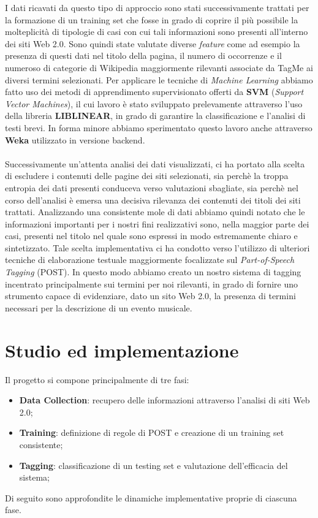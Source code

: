 \documentclass[a4paper]{report}
\begin{document}
I dati ricavati da questo tipo di approccio sono stati successivamente trattati per la formazione di un training set che fosse in grado di coprire  il più possibile la molteplicità di tipologie di casi con cui tali informazioni sono presenti all'interno dei siti Web 2.0. Sono quindi state valutate diverse \textit{feature} come ad esempio la presenza di questi dati nel titolo della pagina, il numero di occorrenze e il numeroso di categorie di Wikipedia maggiormente rilevanti associate da TagMe ai diversi termini selezionati. Per applicare le tecniche di \textit{Machine Learning} abbiamo fatto uso dei metodi di apprendimento supervisionato offerti da \textbf{SVM} (\textit{Support Vector Machines}), il cui lavoro è stato sviluppato prelevamente attraverso l'uso della libreria \textbf{LIBLINEAR}\cite{4}, in grado di garantire la classificazione e l'analisi di testi brevi. In forma minore abbiamo sperimentato questo lavoro anche attraverso \textbf{Weka}\cite{5} utilizzato in versione backend. \\
\\
Successivamente un'attenta analisi dei dati visualizzati, ci ha portato alla scelta di escludere i contenuti delle pagine dei siti selezionati, sia perchè la troppa entropia dei dati presenti conduceva verso valutazioni sbagliate, sia perchè nel corso dell'analisi è emersa una decisiva rilevanza dei contenuti dei titoli dei siti trattati. Analizzando una consistente mole di dati abbiamo quindi notato che le informazioni importanti per i nostri fini realizzativi sono, nella maggior parte dei casi, presenti nel titolo nel quale sono espressi in modo estremamente chiaro e sintetizzato. Tale scelta implementativa ci ha condotto verso l'utilizzo di ulteriori tecniche di elaborazione testuale maggiormente focalizzate sul \textit{Part-of-Speech Tagging} (POST). In questo modo abbiamo creato un nostro sistema di tagging incentrato principalmente sui termini per noi rilevanti, in grado di fornire uno strumento capace di evidenziare, dato un sito Web 2.0, la presenza di termini necessari per la descrizione di un evento musicale. 

\chapter{Studio ed implementazione}
Il progetto si compone principalmente di tre fasi:
\begin{itemize}
\item \textbf{Data Collection}: recupero delle informazioni attraverso l'analisi di siti Web 2.0;
\item \textbf{Training}: definizione di regole di POST e creazione di un training set consistente;
\item \textbf{Tagging}: classificazione di un testing set e valutazione dell'efficacia del sistema;
\end{itemize}
Di seguito sono approfondite le dinamiche implementative proprie di ciascuna fase.
\end{document}
